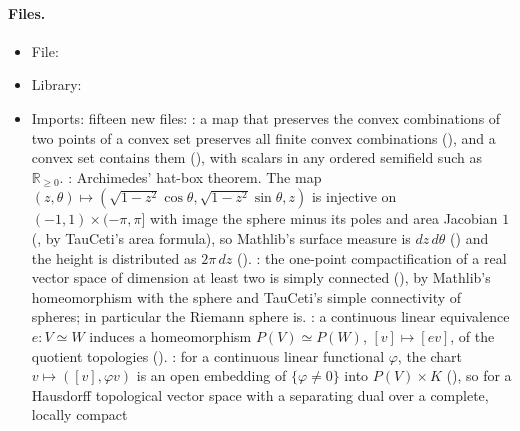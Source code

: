 \documentclass[11pt]{article}
\begin{document}
\paragraph{Files.}\leavevmode
\begin{itemize}
\item File: 
\item Library: 
\item Imports: fifteen new  files:\newline
  : a map that preserves the convex combinations
  of two points of a convex set preserves all finite convex combinations
  (), and a convex set contains them
  (), with scalars in any ordered semifield such as
  $\mathbb R_{\ge 0}$.\newline
  : Archimedes' hat-box theorem.
  The map $(z, \theta) \mapsto (\sqrt{1 - z^2}\cos\theta, \sqrt{1 - z^2}\sin\theta, z)$ is
  injective on $(-1, 1) \times (-\pi, \pi]$ with image the sphere minus its poles and area
  Jacobian $1$ (, by TauCeti's area
  formula), so Mathlib's surface measure is $dz\,d\theta$
  () and the height is distributed as
  $2\pi\,dz$ ().\newline
  : the one-point
  compactification of a real vector space of dimension at least two is simply connected
  (), by Mathlib's homeomorphism with the
  sphere and TauCeti's simple connectivity of spheres; in particular the Riemann sphere is.\newline
  : a continuous linear equivalence
  $e : V \simeq W$ induces a homeomorphism $P(V) \simeq P(W)$, $[v] \mapsto [ev]$, of the quotient
  topologies ().\newline
  : for a continuous linear
  functional $\varphi$, the chart $v \mapsto ([v], \varphi v)$ is an open embedding of
  $\{\varphi \ne 0\}$ into $P(V) \times K$ (), so for
  a Hausdorff topological vector space with a separating dual over a complete, locally compact

\end{itemize}
\end{document}
